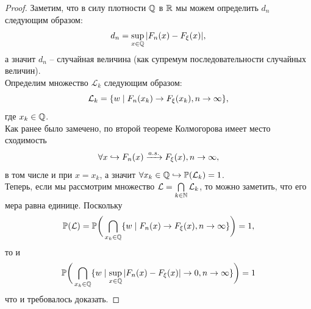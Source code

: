 \begin{proof}
    Заметим, что в силу плотности $\mathbb{Q}$ в $\mathbb{R}$ мы можем определить $d_n$ следующим образом:
    \[
        d_n = \sup\limits_{x \in \mathbb{Q}} |F_n(x) - F_\xi(x)|,
    \]
    а значит $d_n$ -- случайная величина (как супремум последовательности случайных величин). \\
    Определим множество $\mathcal{L}_k$ следующим образом:
    \[
        \mathcal{L}_k = \{w \mid F_n(x_k) \rightarrow F_\xi(x_k), n \rightarrow \infty\},
    \]
    где $x_k \in \mathbb{Q}$. \\
    Как ранее было замечено, по второй теореме Колмогорова имеет место сходимость 
    \[
        \forall x \hookrightarrow F_n(x) \xrightarrow{a.s.} F_\xi(x), n \rightarrow \infty,
    \]
    в том числе и при $x = x_k$, а значит $\forall x_k \in \mathbb{Q} \hookrightarrow\mathbb{P}(\mathcal{L}_k) = 1 $. \\
    Теперь, если мы рассмотрим множество $\mathcal{L} = \bigcap\limits_{k \in \mathbb{N}} \mathcal{L}_k$, то можно заметить, что его мера равна единице. 
    Поскольку 
    \[
        \mathbb{P}(\mathcal{L}) = \mathbb{P}\biggr(\bigcap\limits_{x_k \in \mathbb{Q}}\{w \mid F_n(x) \rightarrow F_\xi(x), n \rightarrow \infty\}\biggr) = 1,
    \]
    то и 
    \[
        \mathbb{P}\biggr(\bigcap\limits_{x_k \in \mathbb{Q}} \{w \mid \sup\limits_{x \in \mathbb{Q}}|F_n(x) - F_\xi(x)| \rightarrow 0, n \rightarrow \infty\}\biggr) = 1
    \]
    что и требовалось доказать.
\end{proof}